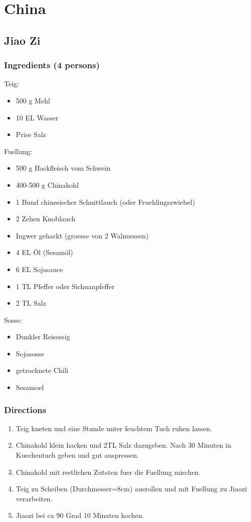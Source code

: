 
\section{China}

\subsection{Jiao Zi}
\subsubsection*{Ingredients (4 persons)}
Teig:
\begin{itemize}
\item[] 500 g Mehl
\item[] 10 EL Wasser
\item[] Prise Salz
\end{itemize}
Fuellung:
\begin{itemize}
\item[] 500 g Hackfleisch vom Schwein
\item[] 400-500 g Chinakohl
\item[] 1 Bund chinesischer Schnittlauch (oder Fruehlingszwiebel)
\item[] 2 Zehen Knoblauch
\item[] Ingwer gehackt (groesse von 2 Walnuessen)
\item[] 4 EL Öl (Sesamöl)
\item[] 6 EL Sojasauce
\item[] 1 TL Pfeffer oder Sichuanpfeffer
\item[] 2 TL Salz
\end{itemize}
Sosse:
\begin{itemize}
\item[] Dunkler Reisessig
\item[] Sojasosse
\item[] getrocknete Chili
\item[] Sesamoel
\end{itemize}

\subsubsection*{Directions}
\begin{enumerate}
\item Teig kneten und eine Stunde unter feuchtem Tuch ruhen lassen.
\item Chinakohl klein hacken und 2TL Salz dazugeben. Nach 30 Minuten in Kuechentuch geben und gut auspressen. 
\item Chinakohl mit restlichen Zutaten fuer die Fuellung mischen.
\item Teig zu Scheiben (Durchmesser=8cm) ausrollen und mit Fuellung zu Jiaozi verarbeiten.
\item Jiaozi bei ca 90 Grad 10 Minuten kochen.
\end{enumerate}
\pagebreak


